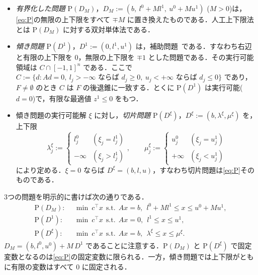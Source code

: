 \documentclass[11pt,a4paper]{ltjsarticle}
\theoremstyle{plain}
\theoremstyle{definition}
\theoremstyle{remark}
\newcommand{\Pb}{\mathrm{P}}
\begin{document}
\begin{itemize}
\item \emph{有界化した問題} $\Pb(D_M)$，$D_M:=(b,\ l^0+Ml^1,\ u^0+Mu^1)$ ($M>0$)は，\eqref{eq:P}の無限の上下限をすべて $\mp M$ に置き換えたものである．人工上下限法とは $\Pb(D_M)$ に対する双対単体法である．
\item \emph{傾き問題} $\Pb(D^1)$，$D^1:=(0,l^1,u^1)$ は，補助問題~\cite{fourer1994}である．すなわち右辺と有限の上下限を $0$，無限の上下限を $\mp1$ とした問題である．その実行可能領域は $C\cap[-1,1]^n$ である．ここで $C:=\{d: Ad=0,\ l_j>-\infty \text{ ならば } d_j\ge0,\ u_j<+\infty \text{ ならば } d_j\le0\}$ であり，$F\neq\emptyset$ のとき $C$ は $F$ の後退錐に一致する．とくに $\Pb(D^1)$ は実行可能($d=0$)で，有限な最適値 $z^1\le0$ をもつ．
\item 傾き問題の実行可能解 $\xi$ に対し，\emph{切片問題} $\Pb(D^\xi)$，$D^\xi:=(b,\lambda^\xi,\mu^\xi)$ を，上下限
\begin{equation}
  \lambda^\xi_j:=\begin{cases}l^0_j&(\xi_j=l^1_j)\\-\infty&(\xi_j>l^1_j)\end{cases},\qquad
  \mu^\xi_j:=\begin{cases}u^0_j&(\xi_j=u^1_j)\\+\infty&(\xi_j<u^1_j)\end{cases}
  \label{eq:intercept}
\end{equation}
により定める．$\xi=0$ ならば $D^\xi=(b,l,u)$，すなわち切片問題は\eqref{eq:P}そのものである．
\end{itemize}
3つの問題を明示的に書けば次の通りである．
\begin{align*}
  \Pb(D_M):&\ \ \min\ c^\top x\ \ \text{s.t.}\ \ Ax=b,\ \ l^0+Ml^1\le x\le u^0+Mu^1,\\
  \Pb(D^1):&\ \ \min\ c^\top x\ \ \text{s.t.}\ \ Ax=0,\ \ l^1\le x\le u^1,\\
  \Pb(D^\xi):&\ \ \min\ c^\top x\ \ \text{s.t.}\ \ Ax=b,\ \ \lambda^\xi\le x\le \mu^\xi.
\end{align*}
$D_M=(b,l^0,u^0)+M\,D^1$ であることに注意する．$\Pb(D_M)$ と $\Pb(D^\xi)$ で固定変数となるのは\eqref{eq:P}の固定変数に限られる．一方，傾き問題では上下限がともに有限の変数はすべて $0$ に固定される．
\end{document}
